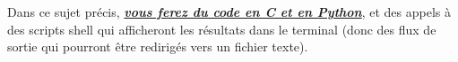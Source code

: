 \vspace*{1cm}


\noindent Dans ce sujet précis, \underline{\textbf{\textit{vous ferez du code en C et en Python}}}, et des appels à des scripts shell qui afficheront les résultats dans le terminal (donc des flux de sortie qui pourront être redirigés vers un fichier texte).








